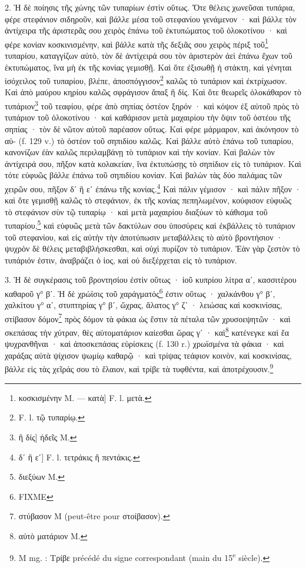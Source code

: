 \documentclass[a4paper, 11pt, oneside, polutonikogreek, french]{article}
\begin{document}
2. Ἡ δὲ ποίησις τῆς χώνης τῶν τυπαρίων ἐστὶν οὕτως. Ὅτε θέλεις χωνεῦσαι τυπάρια, φέρε στεφάνιον σιδηροῦν, καὶ βάλλε μέσα τοῦ στεφανίου γενάμενον · καὶ βάλλε τὸν ἀντίχειρα τῆς ἀριστερᾶς σου χειρὸς ἐπάνω τοῦ ἐκτυπώματος τοῦ ὁλοκοτίνου · καὶ φέρε κονίαν κοσκινισμένην, καὶ βάλλε κατὰ τῆς δεξιᾶς σου χειρὸς πέριξ τοῦ\footnote{κοσκισμένην M. --- κατὰ] F. l. μετὰ.} τυπαρίου, καταγγίζων αὐτὸ, τὸν δὲ ἀντίχειρά σου τὸν ἀριστερὸν ἀεὶ ἐπάνω ἔχων τοῦ ἐκτυπώματος, ἵνα μὴ ἐκ τῆς κονίας γεμισθῇ. Καὶ ὅτε ἐξισωθῇ ἡ στάκτη, καὶ γένηται ἰσόχειλος τοῦ τυπαρίου, βλέπε, ἀποσπόγγισον\footnote{F. l. τῷ τυπαρίῳ.} καλῶς τὸ τυπάριον καὶ ἐκτρίχωσον. Καὶ ἀπὸ μαύρου κηρίου καλῶς σφράγισον ἅπαξ ἢ δίς. Καὶ ὅτε θεωρεῖς ὁλοκάθαρον τὸ τυπάριον\footnote{ἢ δίς] ἡδεῖς M.} τοῦ τεαφίου, φέρε ἀπὸ σηπίας ὀστέον ξηρόν · καὶ κόψον ἐξ αὐτοῦ πρὸς τὸ τυπάριον τοῦ ὁλοκοτίνου · καὶ καθάρισον μετὰ μαχαιρίου τὴν ὄψιν τοῦ ὀστέου τῆς σηπίας · τὸν δὲ νῶτον αὐτοῦ παρέασον οὕτως. Καὶ φέρε μάρμαρον, καὶ ἀκόνησον τὸ αὐ- (f. 129 v.) τὸ ὀστέον τοῦ σηπιδίου καλῶς. Καὶ βάλλε αὐτὸ ἐπάνω τοῦ τυπαρίου, κανονίζων ἐὰν καλῶς περιλαμβάνῃ τὸ τυπάριον καὶ τὴν κονίαν. Καὶ βαλὼν τὸν ἀντίχειρά σου, πῆξον κατὰ κολακείαν, ἵνα ἐκτυπώσῃς τὸ σηπίδιον εἰς τὸ τυπάριον. Καὶ τότε εὐφυῶς βάλλε ἐπάνω τοῦ σηπιδίου κονίαν. Καὶ βαλὼν τὰς δύο παλάμας τῶν χειρῶν σου, πῆξον δʹ ἢ εʹ ἐπάνω τῆς κονίας.\footnote{δʹ ἢ εʹ] F. l. τετράκις ἢ πεντάκις.} Καὶ πάλιν γέμισον · καὶ πάλιν πῆξον · καὶ ὅτε γεμισθῇ καλῶς τὸ στεφάνιον, ἐκ τῆς κονίας πεπηλωμένον, κούφισον εὐφυῶς τὸ στεφάνιον σὺν τῷ τυπαρίῳ · καὶ μετὰ μαχαιρίου διαξύων τὸ κάθισμα τοῦ τυπαρίου,\footnote{διεξύων M.} καὶ εὐφυῶς μετὰ τῶν δακτύλων σου ὑποσύρεις καὶ ἐκβάλλεις τὸ τυπάριον τοῦ στεφανίου, καὶ εἰς αὐτὴν τὴν ἀποτύπωσιν μεταβάλλεις τὸ αὐτὸ βροντήσιον · ψυχρὸν δὲ θέλεις μεταβιβλήσκεσθαι, καὶ οὐχὶ πυρίζον τὸ τυπάριον. Ἐὰν γὰρ ζεστὸν τὸ τυπάριόν ἐστιν, ἀναβράζει ὁ ἰος, καὶ οὐ διεξέρχεται εἰς τὸ τυπάριον.

3. Ἡ δὲ συγκέρασις τοῦ βροντησίου ἐστὶν οὕτως · ἰοῦ κυπρίου λίτρα αʹ, κασσιτέρου καθαροῦ γ° βʹ. Ἡ δὲ χρώϊσις τοῦ χαράγματός\footnote{FIXME} ἐστιν οὕτως · χαλκάνθου γ° βʹ, χαλκίτου γ° αʹ, στυπτηρίας γ° βʹ, ὤχρας, ἅλατος γ° ζʹ · λειώσας καὶ κοσκινίσας, στίβασον δόμον\footnote{στύβασον M (peut-être pour στοίβασον).} πρὸς δόμον τὰ φάκια ὡς ἔστιν τὰ πέταλα τῶν χρυσοεψητῶν · καὶ σκεπάσας τὴν χύτραν, θὲς αὐτοματάριον καίεσθαι ὥρας γʹ · καὶ\footnote{αὐτὸ ματάριον M.} κατένεγκε καὶ ἔα ψυχρανθῆναι · καὶ ἀποσκεπάσας εὑρίσκεις (f. 130 r.) χρωϊσμένα τὰ φάκια · καὶ χαράξας αὐτὰ ψίχισον ψωμίῳ καθαρῷ · καὶ τρίψας τεάφιον κοινὸν, καὶ κοσκινίσας, βάλλε εἰς τὰς χεῖράς σου τὸ ἔλαιον, καὶ τρίβε τὰ τυφθέντα, καὶ ἀποτρέχουσιν.\footnote{M mg. : Τρίβε précédé du signe correspondant (main du 15\textsuperscript{e} siècle).}
\end{document}
